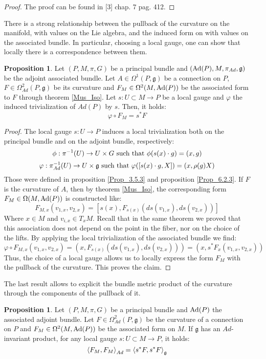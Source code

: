 \documentclass[12pt,a4paper]{report}
\theoremstyle{definition}
\theoremstyle{Theorem}
\newtheorem{Prop}[Def]{Proposition}
\theoremstyle{definition}
\theoremstyle{definition}
\begin{document}
	\begin{proof}
		The proof can be found in [3] chap. 7 pag. 412.
	\end{proof}
	There is a strong relationship between the pullback of the curvature on the manifold, with values on the Lie algebra, and the induced form on with values on the associated bundle. In particular, choosing a local gauge, one can show that locally there is a correspondence between them.
	\begin{Prop}\label{God_Prop}
		Let $(P,M,\pi,G)$ be a principal bundle and $(\hbox{Ad}(P),M,\pi_{Ad},\mathfrak{g})$ be the adjoint associated bundle. Let $A\in \Omega^1(P,\mathfrak{g})$ be a connection on $P$, $F\in\Omega^2_{Ad}(P,\mathfrak{g})$ be its curvature and $F_M\in\Omega^2(M,\hbox{Ad}(P))$ be the associated form to $F$ through theorem \ref{Mus_Iso}. Let $s:U\subset M\rightarrow P$ be a local gauge and $\varphi$ the induced trivialization of $Ad(P)$ by $s$. Then, it holds: 
		$$\varphi\circ F_{M}=s^*F$$
	\end{Prop}
	\begin{proof}
		The local gauge $s:U\rightarrow P$ induces a local trivialization both on the principal bundle and on the adjoint bundle, respectively:
		$$\phi: \pi^{-1}(U)\rightarrow U\times G\hbox{ such that }\phi(s(x)\cdot g)=(x,g)$$
		$$\varphi: \pi_{Ad}^{-1}(U)\rightarrow U\times \mathfrak{g}\hbox{ such that }\varphi([s(x)\cdot g,X])=(x,\rho(g)X)$$
		Those were defined in proposition \ref{Prop_3.5.3} and proposition \ref{Prop_6.2.3}. If $F$ is the curvature of $A$, then by theorem \ref{Mus_Iso}, the corresponding form $F_M\in\Omega(M,\hbox{Ad}(P))$ is constructed like:
		$$F_{M,x}(v_{1,x},v_{2,x})=[s(x),F_{s(x)}(ds(v_{1,x}),ds(v_{2,x}))]$$
		Where $x\in M$ and $v_{i,x}\in T_xM$.
		Recall that in the same theorem we proved that this association does not depend on the point in the fiber, nor on the choice of the lifts.
		By applying the local trivialization of the associated bundle we find:
		$$\varphi\circ F_{M,x}(v_{1,x},v_{2,x})=(x,F_{s(x)}(ds(v_{1,x}),ds(v_{2,x})))=(x,s^*F_{x}(v_{1,x},v_{2,x}))$$
		Thus, the choice of a local gauge allows us to locally express the form $F_M$ with the pullback of the curvature. This proves the claim.
	\end{proof}
	The last result allows to explicit the bundle metric product of the curvature through the components of the pullback of it.
	\begin{Prop}
		Let $(P,M,\pi,G)$ be a principal bundle and $\hbox{Ad}(P)$ the associated adjoint bundle. Let $F\in\Omega^2_{Ad}(P,\mathfrak{g})$ be the curvature of a connection on $P$ and $F_M\in\Omega^2(M,\hbox{Ad}(P))$ be the associated form on $M$. If $\mathfrak{g}$ has an $Ad$-invariant product, for any local gauge $s:U\subset M\rightarrow P$, it holds:
		$$\braket{F_M,F_M}_{Ad}=\braket{s^*F,s^*F}_\mathfrak{g}$$
	\end{Prop}
\end{document}
